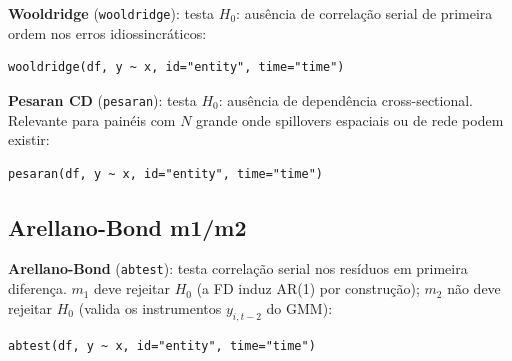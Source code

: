 \textbf{Wooldridge} (\texttt{wooldridge}): testa $H_0$: ausência de
correlação serial de primeira ordem nos erros idiossincráticos:

\begin{lstlisting}
wooldridge(df, y ~ x, id="entity", time="time")
\end{lstlisting}

\textbf{Pesaran CD} (\texttt{pesaran}): testa $H_0$: ausência de dependência
cross-sectional. Relevante para painéis com $N$ grande onde spillovers
espaciais ou de rede podem existir:

\begin{lstlisting}
pesaran(df, y ~ x, id="entity", time="time")
\end{lstlisting}

\subsection{Arellano-Bond m1/m2}

\textbf{Arellano-Bond} (\texttt{abtest}): testa correlação serial nos
resíduos em primeira diferença. $m_1$ deve rejeitar $H_0$ (a FD induz AR(1)
por construção); $m_2$ não deve rejeitar $H_0$ (valida os instrumentos
$y_{i,t-2}$ do GMM):

\begin{lstlisting}
abtest(df, y ~ x, id="entity", time="time")
\end{lstlisting}

